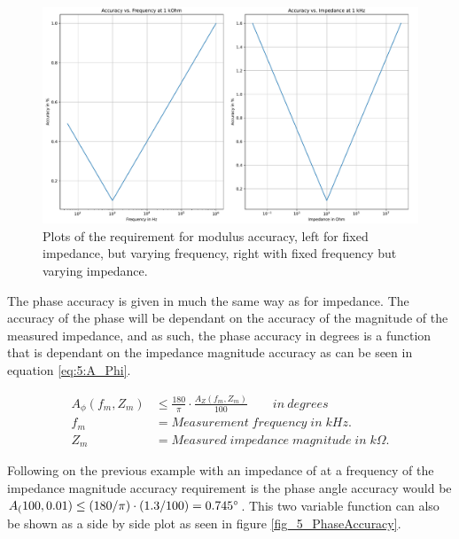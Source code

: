 \begin{figure}[H]
  \centering
  \includegraphics[width=1\textwidth]{Sections/5_SystemRequirements/Figures/ImpedanceSpec.pdf}
  \caption{Plots of the requirement for modulus accuracy, left for fixed impedance, but varying frequency, right with fixed frequency but varying impedance.}
  \label{fig_5_ModulusAccuracy}
\end{figure}

The phase accuracy is given in much the same way as for impedance. The accuracy of the phase will be dependant on the accuracy of the magnitude of the measured impedance, and as such, the phase accuracy in degrees is a function that is dependant on the impedance magnitude accuracy as can be seen in equation \ref{eq:5:A_Phi}.

\begin{equation}
  \begin{split}
    \label{eq:5:A_Phi}
    A_\phi(f_m, Z_m) & \leq \frac{180}{\pi} \cdot \frac{A_Z(f_m,Z_m)}{100} \qquad in \:degrees\\
    f_m & = Measurement \; frequency \; in \; kHz. \\
    Z_m &= Measured \; impedance \; magnitude \; in \; k\Omega.
  \end{split}
\end{equation}

Following on the previous example with an impedance of  at a frequency of  the impedance magnitude accuracy requirement is  the phase
angle accuracy would be $A_(100,0.01) \leq (180/\pi)\cdot(1.3/100) = \SI{0.745}{\degree}$. This two variable function can also be shown as a side by side plot as seen in figure \ref{fig_5_PhaseAccuracy}.

